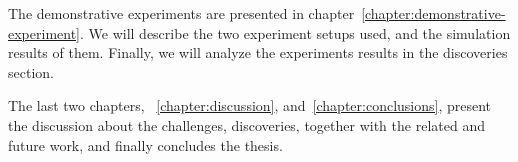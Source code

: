 The demonstrative experiments are presented in chapter~\ref{chapter:demonstrative-experiment}. We will describe the two experiment setups used, and the simulation results of them. Finally, we will analyze the experiments results in the discoveries section.

The last two chapters, ~\ref{chapter:discussion}, and~\ref{chapter:conclusions}, present the discussion about the challenges, discoveries, together with the related and future work, and finally concludes the thesis.

